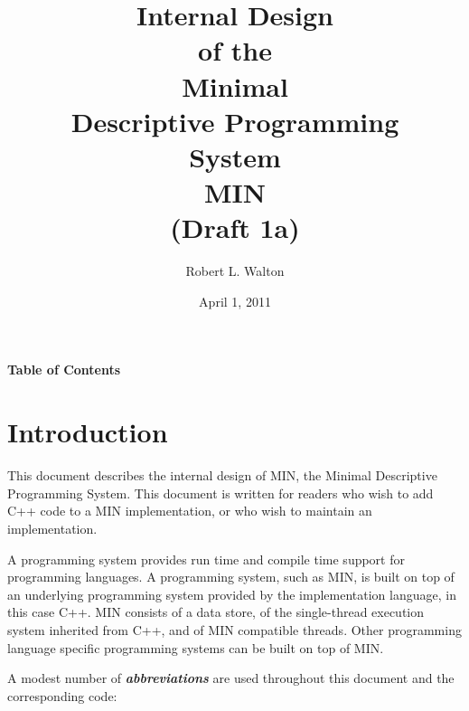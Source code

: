 \documentclass[12pt]{article}
\makeatletter
\renewcommand\tableofcontents{%
    \begin{list}{}%
	     {\setlength{\itemsep}{0in}%
	      \setlength{\topsep}{0in}%
	      \setlength{\parsep}{1ex}%
	      \setlength{\labelwidth}{0in}%
	      \setlength{\baselineskip}{1.5ex}%
	      \setlength{\leftmargin}{0.8in}%
	      \setlength{\rightmargin}{0.8in}}%
    \item\@starttoc{toc}%
    \end{list}}
\newcommand{\skey}[2]{{\bf \em #1#2}\index{#1}}
\makeatother
\begin{document}
        
\title{Internal Design\\[2ex]of the\\[2ex]
       Minimal\\Descriptive Programming\\System\\[2ex]MIN\\[2ex]
       (Draft 1a)}

\author{Robert L. Walton}

\date{April 1, 2011}
 
\maketitle

\newpage
\begin{center}
\large \bf Table of Contents
\end{center}

\bigskip

\tableofcontents 

\newpage

\section{Introduction}

This document describes the internal design of MIN,
the Minimal Descriptive Programming System.
This document is written for readers who wish to add C++ code
to a MIN implementation, or who wish to maintain an implementation.

A programming system provides run time and compile time support
for programming languages.
A programming system, such as MIN, is
built on top of an underlying programming system provided by the
implementation language, in this case C++.
MIN consists of a data store, of the single-thread execution system
inherited from C++, and of MIN compatible threads.
Other programming language specific
programming systems can be built on top of MIN.

A modest number of \skey{abbreviation}s are used throughout this document
and the corresponding code:
\end{document}
